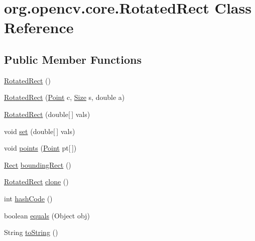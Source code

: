 \hypertarget{classorg_1_1opencv_1_1core_1_1_rotated_rect}{}\section{org.\+opencv.\+core.\+Rotated\+Rect Class Reference}
\label{classorg_1_1opencv_1_1core_1_1_rotated_rect}
\subsection*{Public Member Functions}
\begin{DoxyCompactItemize}
\item 
\mbox{\hyperlink{classorg_1_1opencv_1_1core_1_1_rotated_rect_afe2e2e5d1b21f8c1fcf1510972e4a9f8}{Rotated\+Rect}} ()
\item 
\mbox{\hyperlink{classorg_1_1opencv_1_1core_1_1_rotated_rect_ac9f4486cf440e08b3908adb82c918f3d}{Rotated\+Rect}} (\mbox{\hyperlink{classorg_1_1opencv_1_1core_1_1_point}{Point}} c, \mbox{\hyperlink{classorg_1_1opencv_1_1core_1_1_size}{Size}} s, double a)
\item 
\mbox{\hyperlink{classorg_1_1opencv_1_1core_1_1_rotated_rect_a315676cbfda3a7cc1b96467bffad1059}{Rotated\+Rect}} (double\mbox{[}$\,$\mbox{]} vals)
\item 
void \mbox{\hyperlink{classorg_1_1opencv_1_1core_1_1_rotated_rect_acf0d8aec8425c47614c28bbf8636074e}{set}} (double\mbox{[}$\,$\mbox{]} vals)
\item 
void \mbox{\hyperlink{classorg_1_1opencv_1_1core_1_1_rotated_rect_a3e14a87a025175299ced459c932fdcfe}{points}} (\mbox{\hyperlink{classorg_1_1opencv_1_1core_1_1_point}{Point}} pt\mbox{[}$\,$\mbox{]})
\item 
\mbox{\hyperlink{classorg_1_1opencv_1_1core_1_1_rect}{Rect}} \mbox{\hyperlink{classorg_1_1opencv_1_1core_1_1_rotated_rect_a2d0d8f49a786e5f15673e699659ee0b7}{bounding\+Rect}} ()
\item 
\mbox{\hyperlink{classorg_1_1opencv_1_1core_1_1_rotated_rect}{Rotated\+Rect}} \mbox{\hyperlink{classorg_1_1opencv_1_1core_1_1_rotated_rect_a1accf6c98e5c0af6e5de0424aae8ff8d}{clone}} ()
\item 
int \mbox{\hyperlink{classorg_1_1opencv_1_1core_1_1_rotated_rect_a4aa403fe19c433ce4487780c65224eb1}{hash\+Code}} ()
\item 
boolean \mbox{\hyperlink{classorg_1_1opencv_1_1core_1_1_rotated_rect_a88918bd3c89cbc6e0f64e6dc7cda1af4}{equals}} (Object obj)
\item 
String \mbox{\hyperlink{classorg_1_1opencv_1_1core_1_1_rotated_rect_a4ff12e44c52fb32ff9d6a65597ddc1e9}{to\+String}} ()
\end{DoxyCompactItemize}
